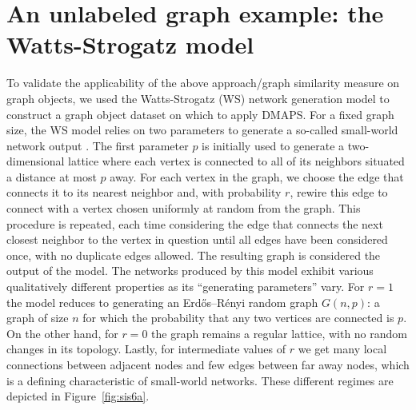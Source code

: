 \section{An unlabeled graph example: the Watts-Strogatz model}

To validate the applicability of the above approach/graph similarity
measure on graph objects, we used the Watts-Strogatz (WS) network
generation model to construct a graph object dataset on which to apply
DMAPS. For a fixed graph size, the WS model relies on two parameters
to generate a so-called small-world network output
\cite{watts_collective_1998}. The first parameter $p$ is initially
used to generate a two-dimensional lattice where each vertex is
connected to all of its neighbors situated a distance at most $p$
away. For each vertex in the graph, we choose the edge that connects
it to its nearest neighbor and, with probability $r$, rewire this edge
to connect with a vertex chosen uniformly at random from the
graph. This procedure is repeated, each time considering the edge that
connects the next closest neighbor to the vertex in question until all
edges have been considered once, with no duplicate edges allowed. The
resulting graph is considered the output of the model. The networks
produced by this model exhibit various qualitatively different
properties as its “generating parameters” vary. For $r=1$ the model
reduces to generating an Erdős–Rényi random graph $G(n,p)$: a graph of
size $n$ for which the probability that any two vertices are connected
is $p$. On the other hand, for $r=0$ the graph remains a regular
lattice, with no random changes in its topology. Lastly, for
intermediate values of $r$ we get many local connections between
adjacent nodes and few edges between far away nodes, which is a
defining characteristic of small-world networks. These different
regimes are depicted in Figure~\ref{fig:sis6a}.

